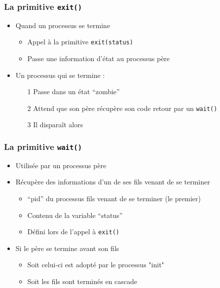 \begin{frame}
\frametitle{La primitive \texttt{exit()}}
\begin{itemize}
\item Quand un processus se termine
\begin{itemize}
\item Appel à la primitive \texttt{exit(status)}
\item Passe une information d’état au processus père
\end{itemize}
\item Un processus qui se termine :
\begin{itemize}
\item[1] Passe dans un état ``zombie''
\item[2] Attend que son père récupère son code retour par un \texttt{wait()}
\item[3] Il disparaît alors
\end{itemize}
\end{itemize}
\end{frame}


\begin{frame}
\frametitle{La primitive \texttt{wait()}}
\begin{itemize}
\item<1> Utilisée par un processus père
\item<1> Récupère des informations d’un de ses fils venant de se terminer
\begin{itemize}
\item ``pid'' du processus fils venant de se terminer (le premier)
\item Contenu de la variable ``status''
\item Défini lors de l'appel à \texttt{exit()}
\end{itemize}
\item <2>Si le père se termine avant son fils
\begin{itemize}
\item Soit celui-ci est adopté par le processus "init"
\item Soit les fils sont terminés en cascade
\end{itemize}
\end{itemize}
\end{frame}

